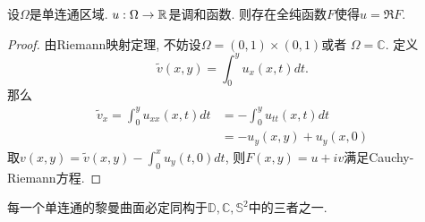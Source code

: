 \begin{proposition}
    设$\Omega$是单连通区域. $u: \Omega \to \mathbb{R}$是调和函数. 则存在全纯函数$F$使得$u=\Re F$.
\end{proposition}
\begin{proof}
    由Riemann映射定理, 不妨设$\Omega = (0,1)\times (0,1)$或者 $\Omega= \mathbb{C}$.  定义
    \begin{equation}
        \tilde{v}(x,y)= \int^y_0 u_x(x,t)dt. 
    \end{equation}
    那么
    \begin{equation}
        \begin{split}
            \tilde{v}_x  =\int^y_0 u_{xx}(x,t)dt &=- \int^y_0 u_{tt}(x,t)dt \\
            &= -u_y(x,y)+u_y(x,0)
        \end{split}
    \end{equation}
    取$v(x,y)=\tilde{v}(x,y)- \int^x_0 u_y(t,0)dt$, 则$F(x,y)=u+iv$满足Cauchy-Riemann方程.
\end{proof}
\begin{theorem}[单值化定理]
    每一个单连通的黎曼曲面必定同构于$\mathbb{D}, \mathbb{C}, \mathbb{S}^2$中的三者之一.
\end{theorem}
